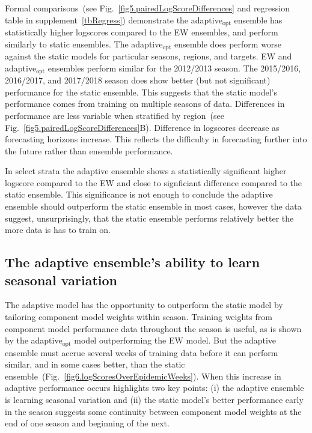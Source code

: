 \documentclass[12pt]{article}
\begin{document}
Formal comparisons~(see Fig.~\ref{fig5.pairedLogScoreDifferences} and regression table in supplement~\ref{tbRegress}) demonstrate the adaptive$_{\text{opt}}$ ensemble has statistically higher logscores compared to the EW ensembles, and perform similarly to static ensembles.
The adaptive$_{\text{opt}}$ ensemble does perform worse against the static models for particular seasons, regions, and targets.
EW and adaptive$_{\text{opt}}$ ensembles perform similar for the 2012/2013 season.
The 2015/2016, 2016/2017, and 2017/2018 season does show better (but not significant) performance for the static ensemble.
This suggests that the static model's performance comes from training on multiple seasons of data.
Differences in performance are less variable when stratified by region~(see Fig.~\ref{fig5.pairedLogScoreDifferences}B).
Difference in logscores decrease as forecasting horizons increase.
This reflects the difficulty in forecasting further into the future rather than ensemble performance.

In select strata the adaptive ensemble shows a statistically significant higher logscore compared to the EW and close to signficiant difference compared to the static ensemble. 
This significance is not enough to conclude the adaptive ensemble should outperform the static ensemble in most cases, however the data suggest, unsurprisingly, that the static ensemble performs relatively better the more data is has to train on.

\subsection{The adaptive ensemble's ability to learn seasonal variation}

The adaptive model has the opportunity to outperform the static model by tailoring component model weights within season.
Training weights from component model performance data throughout the season is useful, as is shown by the adaptive$_{\text{opt}}$ model outperforming the EW model.
But the adaptive ensemble must accrue several weeks of training data before it can perform similar, and in some cases better, than the static ensemble~(Fig.~\ref{fig6.logScoresOverEpidemicWeeks}).
When this increase in adaptive performance occurs highlights two key points: (i) the adaptive ensemble is learning seasonal variation and (ii) the static model's better performance early in the season suggests some continuity between component model weights at the end of one season and beginning of the next.
\end{document}
